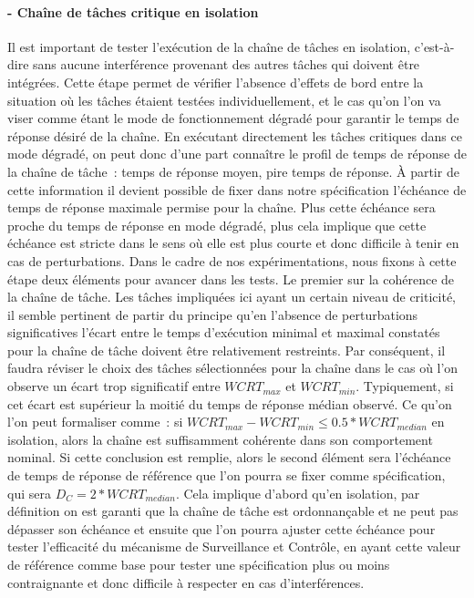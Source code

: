 \documentclass[french, a4paper, 11pt, twoside, pdftex]{StyleThese}
\begin{document}
		\paragraph{ - Chaîne de tâches critique en isolation}
		Il est important de tester l'exécution de la chaîne de tâches en isolation, c'est-à-dire sans aucune interférence provenant des autres tâches qui doivent être intégrées. Cette étape permet de vérifier l'absence d'effets de bord entre la situation où les tâches étaient testées individuellement, et le cas qu'on l'on va viser comme étant le mode de fonctionnement dégradé pour garantir le temps de réponse désiré de la chaîne. En exécutant directement les tâches critiques dans ce mode dégradé, on peut donc d'une part connaître le profil de temps de réponse de la chaîne de tâche~: temps de réponse moyen, pire temps de réponse. À partir de cette information il devient possible de fixer dans notre spécification l'échéance de temps de réponse maximale permise pour la chaîne. Plus cette échéance sera proche du temps de réponse en mode dégradé, plus cela implique que cette échéance est stricte dans le sens où elle est plus courte et donc difficile à tenir en cas de perturbations. 
		Dans le cadre de nos expérimentations, nous fixons à cette étape deux éléments pour avancer dans les tests. Le premier sur la cohérence de la chaîne de tâche. Les tâches impliquées ici ayant un certain niveau de criticité, il semble pertinent de partir du principe qu'en l'absence de perturbations significatives l'écart entre le temps d'exécution minimal et maximal constatés pour la chaîne de tâche doivent être relativement restreints. Par conséquent, il faudra réviser le choix des tâches sélectionnées pour la chaîne dans le cas où l'on observe un écart trop significatif entre $ WCRT_{max} $ et $ WCRT_{min} $. Typiquement, si cet écart est supérieur la moitié du temps de réponse médian observé. Ce qu'on l'on peut formaliser comme~: si $ WCRT_{max} - WCRT_{min} \leq 0.5*WCRT_{median} $ en isolation, alors la chaîne est suffisamment cohérente dans son comportement nominal. 
		Si cette conclusion est remplie, alors le second élément sera l'échéance de temps de réponse de référence que l'on pourra se fixer comme spécification, qui sera $D_C = 2*WCRT_{median}$. Cela implique d'abord qu'en isolation, par définition on est garanti que la chaîne de tâche est ordonnançable et ne peut pas dépasser son échéance et ensuite que l'on pourra ajuster cette échéance pour tester l'efficacité du mécanisme de Surveillance et Contrôle, en ayant cette valeur de référence comme base pour tester une spécification plus ou moins contraignante et donc difficile à respecter en cas d'interférences.
\end{document}
